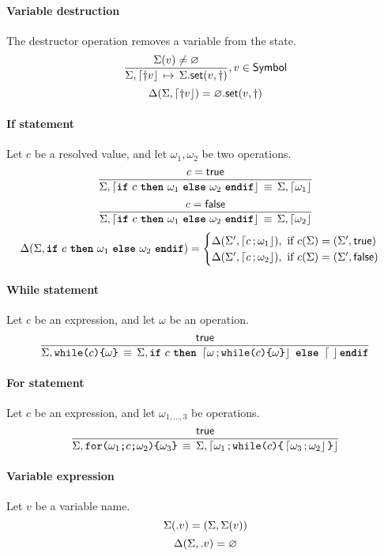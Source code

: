 \paragraph{Variable destruction}
The destructor operation removes a variable from the state.
$$
\semrule
	{\Sigma(v) \neq \varnothing}
	{\Sigma, \stmt{\dagger v}}
	{\StSet{\Sigma}{v}{\dagger}},
		v \in \Symbol
$$
$$
\Delta(\Sigma, \stmt{\dagger v}) = \StSet{\varnothing}{v}{\dagger}
$$


\paragraph{If statement}
Let $c$ be a resolved value, and let $\omega_1, \omega_2$ be two operations.
$$
\semruleeq
	{c = \true}
	{\Sigma, \stmt{\ifstmt{c}{\omega_1}{\omega_2}}}
	{\Sigma, \stmt{\omega_1}}
$$
$$
\semruleeq
	{c = \false}
	{\Sigma, \stmt{\ifstmt{c}{\omega_1}{\omega_2}}}
	{\Sigma, \stmt{\omega_2}}
$$
$$
\Delta(\Sigma, \ifstmt{c}{\omega_1}{\omega_2}) =
\begin{cases}
  \Delta(\Sigma', \stmt{c}{\omega_1}), ~ \text{if } c(\Sigma) = (\Sigma', \true)\\
  \Delta(\Sigma', \stmt{c}{\omega_2}), ~ \text{if } c(\Sigma) = (\Sigma', \false)
\end{cases}
$$

\paragraph{While statement}
Let $c$ be an expression, and let $\omega$ be an operation.
$$
\semruleeq
       {\true}
       {\Sigma, \whilestmt{c}{\omega}}
       {\Sigma, \ifstmt{c}{\stmt{\omega}{\whilestmt{c}{\omega}}}{\stmt}}
$$

\paragraph{For statement}
Let $c$ be an expression, and let $\omega_{1,\ldots,3}$ be operations.
$$
\semruleeq
        {\true}
        {\Sigma, \forstmt{\omega_1}{c}{\omega_2}{\omega_3}}
        {\Sigma, \stmt{\omega_1}{\whilestmt{c}{\stmt{\omega_3}{\omega_2}}}}
$$

\paragraph{Variable expression}
Let $v$ be a variable name.
$$
\Sigma({.}v) = (\Sigma, \Sigma(v))
$$
$$
\Delta(\Sigma, {.}v) = \varnothing
$$


